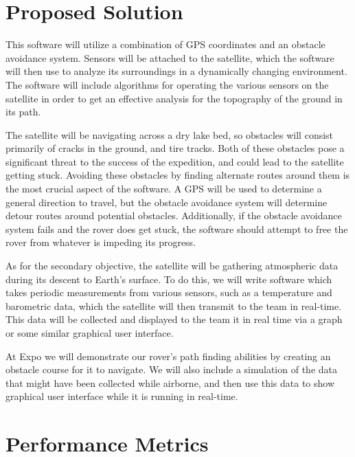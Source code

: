 \documentclass[10pt,onecolumn,draftclsnofoot,journal]{IEEEtran}
\begin{document}
\section*{\textbf{Proposed Solution}}
\noindent This software will utilize a combination of GPS coordinates and an obstacle avoidance system. Sensors will be attached to the satellite, which the software will then use to analyze its surroundings in a dynamically changing environment. The software will include algorithms for operating the various sensors on the satellite in order to get an effective analysis for the topography of the ground in its path.
\par\vspace{3mm} 
\noindent The satellite will be navigating across a dry lake bed, so obstacles will consist primarily of cracks in the ground, and tire tracks. Both of these obstacles pose a significant threat to the success of the expedition, and could lead to the satellite getting stuck. Avoiding these obstacles by finding alternate routes around them is the most crucial aspect of the software. A GPS will be used to determine a general direction to travel, but the obstacle avoidance system will determine detour routes around potential obstacles. Additionally, if the obstacle avoidance system fails and the rover does get stuck, the software should attempt to free the rover from whatever is impeding its progress. 
\par\vspace{3mm}
\noindent As for the secondary objective, the satellite will be gathering atmospheric data during its descent to Earth’s surface. To do this, we will write software which takes periodic measurements from various sensors, such as a temperature and barometric data, which the satellite will then transmit to the team in real-time. This data will be collected and displayed to the team it in real time via a graph or some similar graphical user interface. 
\par\vspace{3mm}
\noindent At Expo we will demonstrate our rover's path finding abilities by creating an obstacle course for it to navigate. We will also include a simulation of the data that might have been collected while airborne, and then use this data to show graphical user interface while it is running in real-time.

\section*{\textbf{Performance Metrics}}
\noindent
\end{document}
